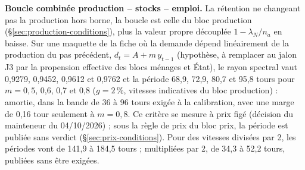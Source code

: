\documentclass[11pt,a4paper]{article}
\begin{document}
\textbf{Boucle combinée production – stocks – emploi.} La rétention ne changeant pas la production hors borne, la boucle est celle du bloc production (\S\ref{sec:production-conditions}), plus la valeur propre découplée $1 - \lambda_N/n_a$ en baisse. Sur une maquette de la fiche où la demande dépend linéairement de la production du pas précédent, $d_t = A + m\,y_{t-1}$ (hypothèse, à remplacer au jalon J3 par la propension effective des blocs ménages et État), le rayon spectral vaut 0,9279, 0,9452, 0,9612 et 0,9762 et la période 68,9, 72,9, 80,7 et 95,8 tours pour $m = 0{,}5$, 0,6, 0,7 et 0,8 ($g = 2\,\%$, vitesses indicatives du bloc production) : amortie, dans la bande de 36 à 96 tours exigée à la calibration, avec une marge de 0,16 tour seulement à $m = 0{,}8$. Ce critère se mesure à prix figé (décision du mainteneur du 04/10/2026) ; sous la règle de prix du bloc prix, la période est publiée sans verdict (\S\ref{sec:prix-conditions}). Pour des vitesses divisées par 2, les périodes vont de 141,9 à 184,5 tours ; multipliées par 2, de 34,3 à 52,2 tours, publiées sans être exigées.
\end{document}

